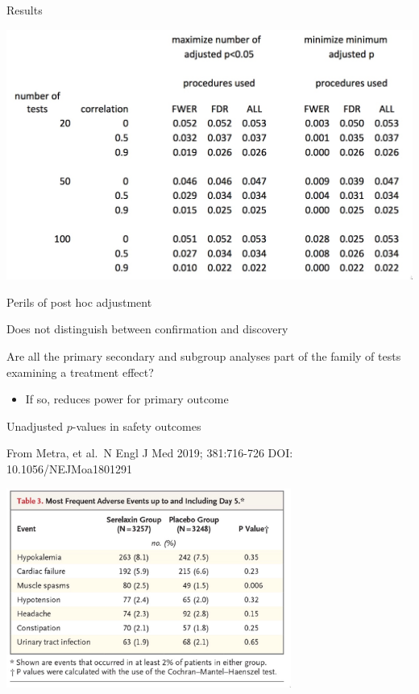 \documentclass[ignorenonframetext,]{beamer}
\providecommand{\tightlist}{%
  \setlength{\itemsep}{0pt}\setlength{\parskip}{0pt}}
\begin{document}
\begin{frame}{Results}
\protect\hypertarget{results}{}

\centering

\includegraphics{../figures/rb_table.jpeg}

\end{frame}

\begin{frame}{Perils of post hoc adjustment}
\protect\hypertarget{perils-of-post-hoc-adjustment}{}

Does not distinguish between confirmation and discovery

Are all the primary secondary and subgroup analyses part of the family
of tests examining a treatment effect?

\begin{itemize}
\tightlist
\item
  If so, reduces power for primary outcome
\end{itemize}

\end{frame}

\begin{frame}{Unadjusted \(p\)-values in safety outcomes}
\protect\hypertarget{unadjusted-p-values-in-safety-outcomes}{}

From Metra, et al.~N Engl J Med 2019; 381:716-726 DOI:
10.1056/NEJMoa1801291

\centering

\includegraphics[width=0.7\textwidth,height=\textheight]{../figures/safety_p-values.jpeg}

\end{frame}
\end{document}
